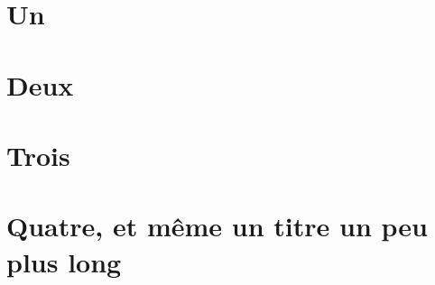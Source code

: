 \documentclass{book}
\begin{document}
\chapter{Un}


\chapter{Deux}


\chapter{Trois}


\chapter{Quatre, et même un titre un peu plus long}

\end{document}
